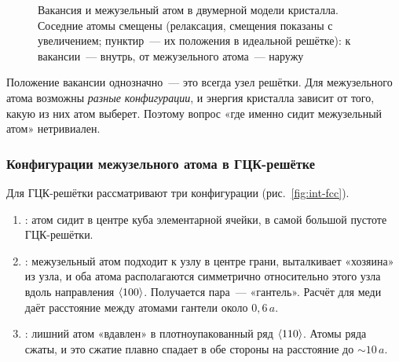 \begin{figure}[ht]
\centering
{}
\caption{Вакансия и межузельный атом в двумерной модели кристалла.
Соседние атомы смещены (релаксация, смещения показаны с увеличением;
пунктир~— их положения в идеальной решётке): к вакансии~— внутрь,
от межузельного атома~— наружу}
\label{fig:vac-int-2d}
\end{figure}

\begin{glavnoe}
Положение вакансии однозначно~— это всегда узел решётки. Для
межузельного атома возможны \emph{разные конфигурации}, и энергия
кристалла зависит от того, какую из них атом выберет. Поэтому вопрос
«где именно сидит межузельный атом» нетривиален.
\end{glavnoe}

\subsubsection{Конфигурации межузельного атома в ГЦК-решётке}
Для ГЦК-решётки рассматривают три конфигурации (рис.~\ref{fig:int-fcc}).

\begin{enumerate}
\item {}: атом сидит в центре
куба элементарной ячейки, в самой большой пустоте ГЦК-решётки.
\item {}: межузельный атом подходит к узлу
в центре грани, выталкивает «хозяина» из узла, и оба атома располагаются
симметрично относительно этого узла вдоль направления $\langle 100\rangle$.
Получается пара~— «гантель». Расчёт для меди даёт расстояние между атомами
гантели около $0{,}6\,a$.
\item {} : лишний атом «вдавлен» в
плотноупакованный ряд $\langle 110\rangle$. Атомы ряда сжаты, и это сжатие
плавно спадает в обе стороны на расстояние до $\sim 10\,a$.
\end{enumerate}

